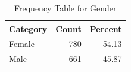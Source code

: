 \begin{table}[!h]
\centering
\caption{\label{tab:tab:Gender}Frequency Table for Gender}
\centering
\begin{tabular}[t]{lrr}
\toprule
Category & Count & Percent\\
\midrule
Female & 780 & 54.13\\
Male & 661 & 45.87\\
\bottomrule
\end{tabular}
\end{table}
